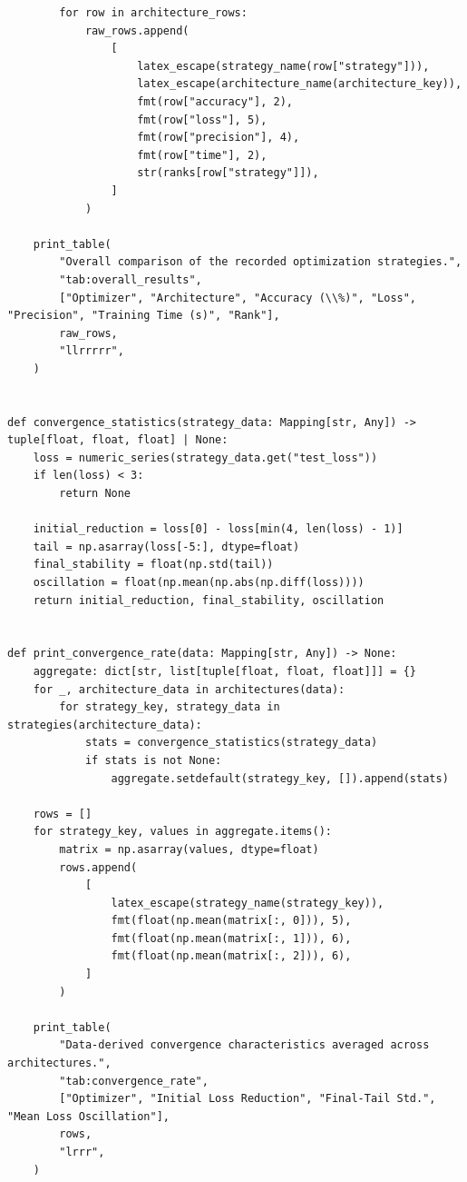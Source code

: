 \begin{verbatim}
        for row in architecture_rows:
            raw_rows.append(
                [
                    latex_escape(strategy_name(row["strategy"])),
                    latex_escape(architecture_name(architecture_key)),
                    fmt(row["accuracy"], 2),
                    fmt(row["loss"], 5),
                    fmt(row["precision"], 4),
                    fmt(row["time"], 2),
                    str(ranks[row["strategy"]]),
                ]
            )

    print_table(
        "Overall comparison of the recorded optimization strategies.",
        "tab:overall_results",
        ["Optimizer", "Architecture", "Accuracy (\\%)", "Loss", "Precision", "Training Time (s)", "Rank"],
        raw_rows,
        "llrrrrr",
    )


def convergence_statistics(strategy_data: Mapping[str, Any]) -> tuple[float, float, float] | None:
    loss = numeric_series(strategy_data.get("test_loss"))
    if len(loss) < 3:
        return None

    initial_reduction = loss[0] - loss[min(4, len(loss) - 1)]
    tail = np.asarray(loss[-5:], dtype=float)
    final_stability = float(np.std(tail))
    oscillation = float(np.mean(np.abs(np.diff(loss))))
    return initial_reduction, final_stability, oscillation


def print_convergence_rate(data: Mapping[str, Any]) -> None:
    aggregate: dict[str, list[tuple[float, float, float]]] = {}
    for _, architecture_data in architectures(data):
        for strategy_key, strategy_data in strategies(architecture_data):
            stats = convergence_statistics(strategy_data)
            if stats is not None:
                aggregate.setdefault(strategy_key, []).append(stats)

    rows = []
    for strategy_key, values in aggregate.items():
        matrix = np.asarray(values, dtype=float)
        rows.append(
            [
                latex_escape(strategy_name(strategy_key)),
                fmt(float(np.mean(matrix[:, 0])), 5),
                fmt(float(np.mean(matrix[:, 1])), 6),
                fmt(float(np.mean(matrix[:, 2])), 6),
            ]
        )

    print_table(
        "Data-derived convergence characteristics averaged across architectures.",
        "tab:convergence_rate",
        ["Optimizer", "Initial Loss Reduction", "Final-Tail Std.", "Mean Loss Oscillation"],
        rows,
        "lrrr",
    )



\end{verbatim}
